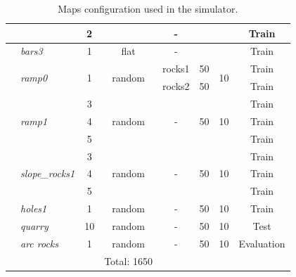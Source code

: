 \documentclass[../document.tex]{subfiles}
\begin{document}
\begin{table} [htbp]
\begin{tabular}[]{@{}llcccccc@{}}
      && 2 &  & - &  &  & Train \\
      \hline
      &\emph{bars3} & 1 & flat  & - &  &  & Train \\
      \hline
      &\multirow{2}{*}{\emph{ramp0}} & \multirow{2}{*}{1} & \multirow{2}{*}{random} & rocks1 & 50 & \multirow{2}{*}{10} & Train \\
      &&&& rocks2 & 50 &  & Train \\
      \hline
      &\multirow{3}{*}{\emph{ramp1}} & 3 & \multirow{3}{*}{random} & \multirow{3}{*}{-} & \multirow{3}{*}{50} & \multirow{3}{*}{10} & Train \\
      && 4 &&&& & Train \\
      && 5 &&&& & Train \\
      \hline 
      &\multirow{3}{*}{\emph{slope\_rocks1}} & 3 & \multirow{3}{*}{random} & \multirow{3}{*}{-} & \multirow{3}{*}{50} & \multirow{3}{*}{10} & Train \\
      && 4 &&&& & Train \\
      && 5 &&&& & Train \\
      \hline
      &\emph{holes1} & 1 &random & - & 50 & 10 & Train \\
      \hline
      &\emph{quarry} & 10 &random & - & 50 & 10 & Test \\
      \hline
      &\emph{arc rocks} & 1 &random & - & 50 & 10 & Evaluation \\
      \hline
      &&& Total: 1650 & & \\ 
      \bottomrule   
    \end{tabular}
    \label{table: maps}
    \caption{Maps configuration used in the simulator.}
  \end{table}
\end{document}

